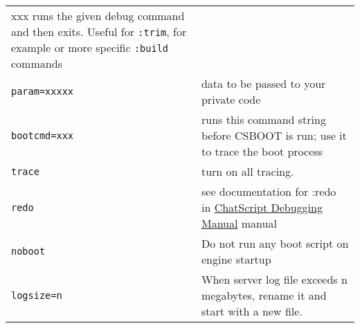 \documentclass[]{article}
\begin{document}
\begin{longtable}[]{@{}ll@{}}
\begin{minipage}[t]{0.76\columnwidth}
xxx runs the given debug command and then exits. Useful for
\texttt{:trim}, for example or more specific \texttt{:build}
commands\strut
\end{minipage}\tabularnewline
\begin{minipage}[t]{0.18\columnwidth}\raggedright\strut
\texttt{param=xxxxx}\strut
\end{minipage} & \begin{minipage}[t]{0.76\columnwidth}\raggedright\strut
data to be passed to your private code\strut
\end{minipage}\tabularnewline
\begin{minipage}[t]{0.18\columnwidth}\raggedright\strut
\texttt{bootcmd=xxx}\strut
\end{minipage} & \begin{minipage}[t]{0.76\columnwidth}\raggedright\strut
runs this command string before CSBOOT is run; use it to trace the boot
process\strut
\end{minipage}\tabularnewline
\begin{minipage}[t]{0.18\columnwidth}\raggedright\strut
\texttt{trace}\strut
\end{minipage} & \begin{minipage}[t]{0.76\columnwidth}\raggedright\strut
turn on all tracing.\strut
\end{minipage}\tabularnewline
\begin{minipage}[t]{0.18\columnwidth}\raggedright\strut
\texttt{redo}\strut
\end{minipage} & \begin{minipage}[t]{0.76\columnwidth}\raggedright\strut
see documentation for :redo in
\href{ChatScript-Debugging-Manual.md}{ChatScript Debugging Manual}
manual\strut
\end{minipage}\tabularnewline
\begin{minipage}[t]{0.18\columnwidth}\raggedright\strut
\texttt{noboot}\strut
\end{minipage} & \begin{minipage}[t]{0.76\columnwidth}\raggedright\strut
Do not run any boot script on engine startup\strut
\end{minipage}\tabularnewline
\begin{minipage}[t]{0.18\columnwidth}\raggedright\strut
\texttt{logsize=n}\strut
\end{minipage} & \begin{minipage}[t]{0.76\columnwidth}\raggedright\strut
When server log file exceeds n megabytes, rename it and start with a new
file.\strut
\end{minipage}\tabularnewline

\end{longtable}
\end{document}
